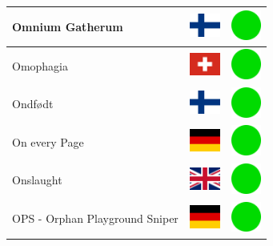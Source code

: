 \documentclass[12pt, a4paper, twoside]{report}
\begin{document}
\begin{center}
\begin{longtable}{|p{5cm}|p{2cm}|p{2cm}|}
 Omnium Gatherum                                            & \includegraphics[width=1cm]{../4x3/fi} &   \includegraphics[width=1cm]{../likes/y} \\ \hline
 Omophagia                                                  & \includegraphics[width=1cm]{../4x3/ch} &   \includegraphics[width=1cm]{../likes/y} \\ \hline
 Ondfødt                                                    & \includegraphics[width=1cm]{../4x3/fi} &   \includegraphics[width=1cm]{../likes/y} \\ \hline
 On every Page                                              & \includegraphics[width=1cm]{../4x3/de} &   \includegraphics[width=1cm]{../likes/y} \\ \hline
 Onslaught                                                  & \includegraphics[width=1cm]{../4x3/gb} &   \includegraphics[width=1cm]{../likes/y} \\ \hline
 OPS - Orphan Playground Sniper                             & \includegraphics[width=1cm]{../4x3/de} &   \includegraphics[width=1cm]{../likes/y} \\ \hline

\end{longtable}
\end{center}
\end{document}
